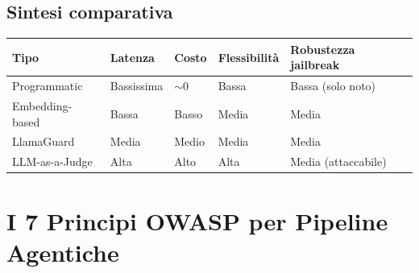 \documentclass[11pt, a4paper]{article}
\begin{document}
\subsection{Sintesi comparativa}

\noindent
\begin{tabularx}{\textwidth}{|l|l|l|X|X|}
\hline
\textbf{Tipo} & \textbf{Latenza} & \textbf{Costo} & \textbf{Flessibilità} & \textbf{Robustezza jailbreak} \\ \hline
Programmatic & Bassissima & $\sim 0$ & Bassa & Bassa (solo noto) \\ \hline
Embedding-based & Bassa & Basso & Media & Media \\ \hline
LlamaGuard & Media & Medio & Media & Media \\ \hline
LLM-as-a-Judge & Alta & Alto & Alta & Media (attaccabile) \\ \hline
\end{tabularx}

\section{I 7 Principi OWASP per Pipeline Agentiche}
\end{document}
